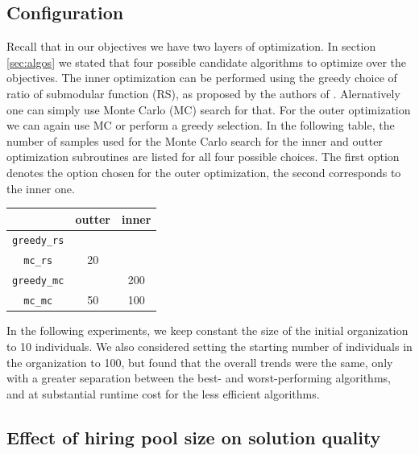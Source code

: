 \subsection{Configuration}

Recall that in our objectives we have two layers of optimization. In section \ref{sec:algos} we stated that four possible candidate algorithms to optimize over the objectives. The inner optimization can be performed using the greedy choice of ratio of submodular function (RS), as proposed by the authors of \cite{bai2016algorithms}. Alernatively one can simply use Monte Carlo (MC) search for that. For the outer optimization we can again use MC or perform a greedy selection. In the following table, the number of samples used for the Monte Carlo search for the inner and outter optimization subroutines are listed for all four possible choices. The first option denotes the option chosen for the outer optimization, the second corresponds to the inner one.

\begin{center}
	\begin{tabular}{ c|c|c } 
		 & outter & inner \\
		\hline
		\texttt{greedy\_rs} &  &  \\
		\texttt{mc\_rs} & 20 &  \\
 		\texttt{greedy\_mc} &  & 200 \\
 		\texttt{mc\_mc} & 50 & 100 \\
	\end{tabular}
\end{center}

In the following experiments, we keep constant the size of the initial organization to 10 individuals. 
We also considered setting the starting number of individuals in the organization to 100, but found that the overall trends were the same, only with a greater separation between the best- and worst-performing algorithms, and at substantial runtime cost for the less efficient algorithms.

\subsection{Effect of hiring pool size on solution quality}
\label{section:num-candidates}

